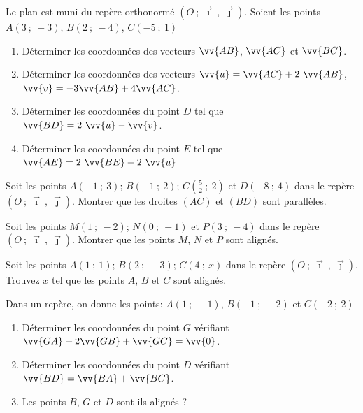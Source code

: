 \documentclass[main.tex]{subfiles}
\begin{document}
\begin{exercise}\hfill 

\noindent Le plan est muni du repère orthonormé $(O~;~ \vec{\imath}~,~ \vec{\jmath})$. Soient les points $A(3~;~-3)$, $B(2~;~-4)$, $C(-5~;~1)$

\begin{enumerate}[label=\alph*),leftmargin=*]
\item Déterminer les coordonnées des vecteurs $\vv{AB}$, $\vv{AC}$ et $\vv{BC}$.
\item  Déterminer les coordonnées des vecteurs $\vv{u}=\vv{AC}+2~\vv{AB}$, $\vv{v}=-3\vv{AB}+4\vv{AC}$. 
\item Déterminer les coordonnées du point $D$ tel que $\vv{BD}=2~\vv{u}-\vv{v}$.
\item Déterminer les coordonnées du point $E$ tel que $\vv{AE}=2~\vv{BE}+2~\vv{u}$
\end{enumerate} 
\end{exercise}
\newpage
\begin{exercise}[révision] \hfill 

\noindent	 Soit les points $A(-1~;~3)$; $B(-1~;~2)$; $C(\tfrac{5}{2}~;~2)$ et  $D(-8~;~4)$ dans le repère $(O~;~ \vec{\imath}~,~ \vec{\jmath})$. Montrer que les droites $(AC)$ et $(BD)$ sont parallèles.
\end{exercise}
\begin{exercise}[révision]  \hfill 

\noindent	Soit les points $M(1~;~-2)$; $N(0~;~-1)$ et $P(3~;~-4)$  dans le repère $(O~;~ \vec{\imath}~,~ \vec{\jmath})$. Montrer que les points $M$, $N$ et $P$ sont alignés.
\end{exercise}
\begin{exercise}[révision]  \hfill 

\noindent	Soit les points $A(1~;~1)$; $B(2~;~-3)$; $C(4~;~x)$  dans le repère $(O~;~ \vec{\imath}~,~ \vec{\jmath})$. Trouvez $x$ tel que les points  $A$, $B$ et $C$ sont alignés.
\end{exercise}
\begin{exercise} \hfill 

\noindent 	Dans un repère, on donne les points: $A(1~;~-1)$, $B(-1~;~-2)$ et $C(-2~;~2)$
\begin{enumerate}[label=\arabic*),leftmargin=*]
\item Déterminer les coordonnées du point $G$ vérifiant $\vv{GA}+2\vv{GB}+\vv{GC}=\vv{0}$.
\item Déterminer les coordonnées du point $D$ vérifiant $\vv{BD}=\vv{BA}+\vv{BC}$.
\item Les points $B$, $G$ et $D$ sont-ils alignés ?
\end{enumerate} 
\end{exercise}
\end{document}
